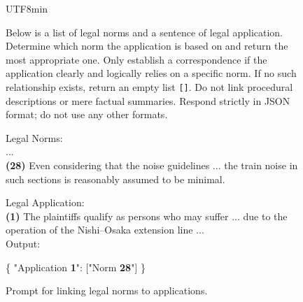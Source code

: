 \documentclass[11pt]{article}
\begin{document}
\begin{figure}[tb]
  \centering
  \begin{CJK}{UTF8}{min}
  \begin{tcolorbox}[enhanced, colback=white]
Below is a list of legal norms and a sentence of legal application.  
Determine which norm the application is based on and return the most appropriate one.  
Only establish a correspondence if the application clearly and logically relies on a specific norm.  
If no such relationship exists, return an empty list \texttt{[]}.  
Do not link procedural descriptions or mere factual summaries.  
Respond strictly in JSON format; do not use any other formats.

Legal Norms: \\
...\\
\textbf{(28)} Even considering that the noise guidelines ... the train noise in such sections is reasonably assumed to be minimal.

Legal Application:  \\
\textbf{(1)} The plaintiffs qualify as persons who may suffer ... due to the operation of the Nishi--Osaka extension line ...\\
Output:

\{  
  "Application \textbf{1}": ["Norm \textbf{28}"]
\}
  \end{tcolorbox}
  \end{CJK}
  \caption{Prompt for linking legal norms to applications.}
  \label{fig:prompt-norm-application}
\end{figure}
\end{document}
